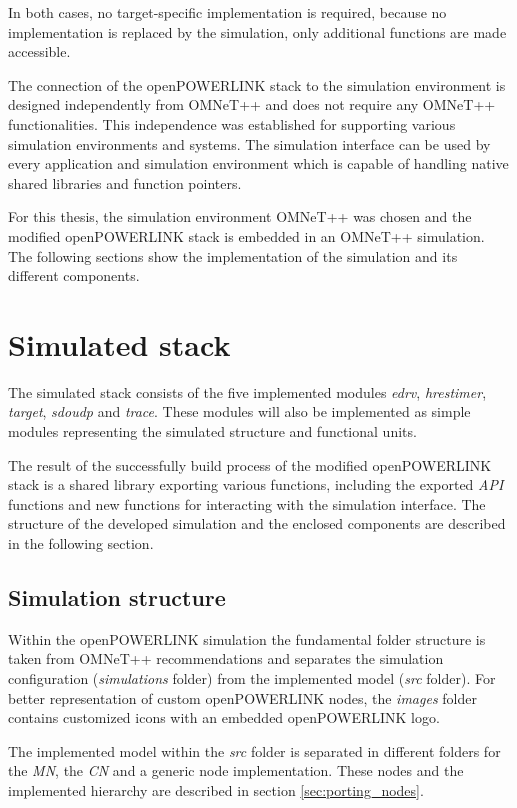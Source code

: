 In both cases, no target-specific implementation is required, because no implementation is replaced by the simulation, only additional functions are made accessible.

The connection of the openPOWERLINK stack to the simulation environment is designed independently from OMNeT++ and does not require any OMNeT++ functionalities.
This independence was established for supporting various simulation environments and systems.
The simulation interface can be used by every application and simulation environment which is capable of handling native shared libraries and function pointers.

For this thesis, the simulation environment OMNeT++ was chosen and the modified openPOWERLINK stack is embedded in an OMNeT++ simulation.
The following sections show the implementation of the simulation and its different components.

\section{Simulated stack}
\label{sec:porting_stack}
The simulated stack consists of the five implemented modules \emph{edrv}, \emph{hrestimer}, \emph{target}, \emph{sdoudp} and \emph{trace}.
These modules will also be implemented as simple modules representing the simulated structure and functional units.

\begin{sloppypar}
The result of the successfully build process of the modified openPOWERLINK stack is a shared library exporting various functions, including the exported \emph{API} functions and new functions for interacting with the simulation interface.
The structure of the developed simulation and the enclosed components are described in the following section.
\end{sloppypar}

\subsection{Simulation structure}
\label{sec:porting_stack_simstructure}
Within the openPOWERLINK simulation the fundamental folder structure is taken from OMNeT++ recommendations and separates the simulation configuration (\emph{simulations} folder) from the implemented model (\emph{src} folder).
For better representation of custom openPOWERLINK nodes, the \emph{images} folder contains customized icons with an embedded openPOWERLINK logo.

The implemented model within the \emph{src} folder is separated in different folders for the \emph{MN}, the \emph{CN} and a generic node implementation.
These nodes and the implemented hierarchy are described in section \ref{sec:porting_nodes}.

